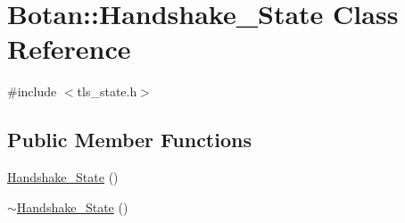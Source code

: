 \hypertarget{classBotan_1_1Handshake__State}{\section{Botan\-:\-:Handshake\-\_\-\-State Class Reference}
\label{classBotan_1_1Handshake__State}
}


{\ttfamily \#include $<$tls\-\_\-state.\-h$>$}

\subsection*{Public Member Functions}
\begin{DoxyCompactItemize}
\item 
\hyperlink{classBotan_1_1Handshake__State_a98c08c82085ffd9937785b7e60e39a96}{Handshake\-\_\-\-State} ()
\item 
\hyperlink{classBotan_1_1Handshake__State_aa74d0a338d7fe319d7483786321cf5b1}{$\sim$\-Handshake\-\_\-\-State} ()
\end{DoxyCompactItemize}
